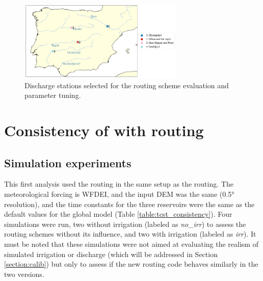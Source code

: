 \begin{figure}[htbp]
    \centering
    \includegraphics[width=0.7\textwidth]{images/chap3/river_discharge/halfdeg_4stations_map.png}
    \caption{Discharge stations selected for the routing scheme evaluation and parameter tuning.}
    \label{fig:halfdeg_stations_map}
\end{figure}

\begin{table}[hbtp]
    \centering
    \caption{Characteristics of river discharge stations used for the routing scheme evaluation and parameter tuning.}
    \label{tab:error_metrics}
\end{table}

\section{Consistency of \native with \std routing}
\label{sec:routing_consistency}
\subsection{Simulation experiments}

This first analysis used the \native routing in the same setup as the \std routing. The meteorological forcing is WFDEI, and the input DEM was the same (0.5° resolution), and the time constants for the three reservoirs were the same as the default values for the global model (Table \ref{table:tcst_consistency}).
Four simulations were run, two without irrigation (labeled as \textit{no\_irr}) to assess the routing schemes without its influence, and two with irrigation (labeled as \textit{irr}). It must be noted that these simulations were not aimed at evaluating the realism of simulated irrigation or discharge (which will be addressed in Section \ref{section:calib}) but only to assess if the new routing code behaves similarly in the two versions.

